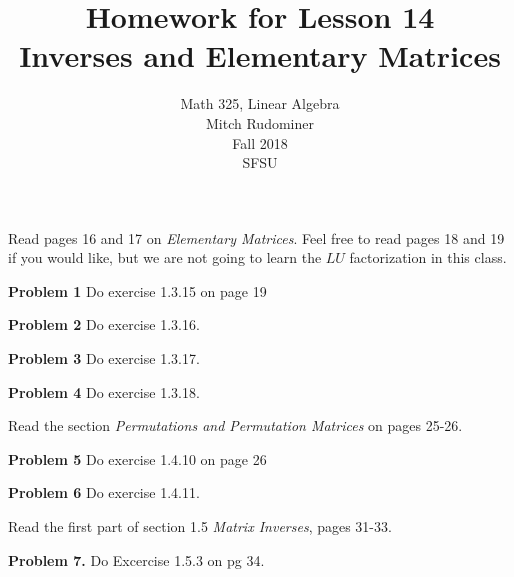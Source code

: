 \documentclass[oneside,12pt]{amsart}
\begin{document}
\title{Homework for Lesson 14 \\ Inverses and Elementary Matrices}
\author{Math 325, Linear Algebra \\ Mitch Rudominer \\ Fall 2018 \\ SFSU }
\date{}

\maketitle

\bigskip

Read pages 16 and 17 on \emph{Elementary Matrices}. Feel free to read pages
18 and 19 if you would like, but we are not going to learn the $LU$
factorization in this class.

\textbf{Problem 1} Do exercise 1.3.15 on page 19

\bigskip
\bigskip
\bigskip
\bigskip
\bigskip
\bigskip
\bigskip
\bigskip
\bigskip
\bigskip

\textbf{Problem 2} Do exercise 1.3.16.


\bigskip
\bigskip
\bigskip
\bigskip
\bigskip
\bigskip
\bigskip
\bigskip
\bigskip
\bigskip

\textbf{Problem 3} Do exercise 1.3.17.

\bigskip
\bigskip
\bigskip
\bigskip
\bigskip
\bigskip
\bigskip
\bigskip
\bigskip
\bigskip

\textbf{Problem 4} Do exercise 1.3.18.

\bigskip
\bigskip
\bigskip
\bigskip
\bigskip
\bigskip
\bigskip
\bigskip
\bigskip
\bigskip

Read the section \emph{Permutations and Permutation Matrices} on pages 25-26.

\medskip

\textbf{Problem 5} Do exercise 1.4.10 on page 26

\bigskip
\bigskip
\bigskip
\bigskip
\bigskip
\bigskip
\bigskip
\bigskip
\bigskip
\bigskip

\textbf{Problem 6} Do exercise 1.4.11.


\bigskip
\bigskip
\bigskip
\bigskip
\bigskip
\bigskip
\bigskip
\bigskip
\bigskip
\bigskip


Read the first part of section 1.5 \emph{Matrix Inverses}, pages 31-33.

\medskip

\textbf{Problem 7.} Do Excercise 1.5.3 on pg 34.

\bigskip
\bigskip
\bigskip
\bigskip
\bigskip
\bigskip
\bigskip
\bigskip
\bigskip
\bigskip
\end{document}
